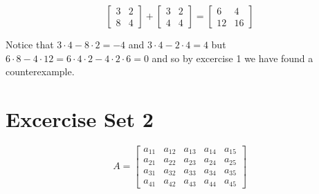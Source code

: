 \documentclass[letterpaper]{article}
\begin{document}
\begin{enumerate}
\[
\left[\begin{array}{cc}3&2\\8&4\end{array}\right]+
\left[\begin{array}{cc}3&2\\4&4\end{array}\right]
=\left[\begin{array}{cc}6&4\\12&16\end{array}\right]
\]

Notice that $3\cdot 4-8\cdot 2=-4$ and $3\cdot 4-2\cdot 4=4$ but $6\cdot8-4\cdot 12=6\cdot4\cdot2-4\cdot2\cdot6=0$ and so by excercise 1 we have found a counterexample.
\end{enumerate}
\section*{Excercise Set 2}

\[A=
\left[\begin{array}{ccccc}
  a_{11}&a_{12}&a_{13}&a_{14}&a_{15}\\
  a_{21}&a_{22}&a_{23}&a_{24}&a_{25}\\
  a_{31}&a_{32}&a_{33}&a_{34}&a_{35}\\
  a_{41}&a_{42}&a_{43}&a_{44}&a_{45}
\end{array}\right]\]
\end{document}
